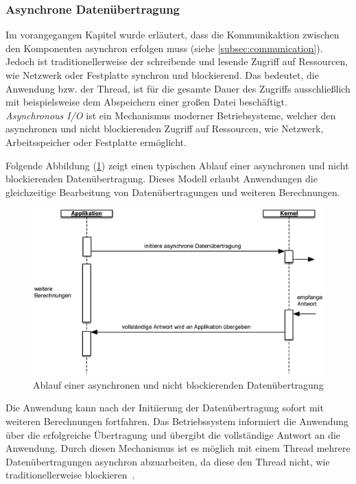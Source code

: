 \subsubsection{Asynchrone Datenübertragung}\label{subsec:async-io}
Im vorangegangen Kapitel wurde erläutert, dass die Kommunikaktion zwischen den Komponenten asynchron erfolgen muss (siehe \autoref{subsec:communication}). Jedoch ist traditionellerweise der schreibende und lesende Zugriff auf Ressourcen, wie Netzwerk oder Festplatte synchron und blockierend. Das bedeutet, die Anwendung bzw. der Thread, ist für die gesamte Dauer des Zugriffs ausschließlich mit beispielsweise dem Abspeichern einer großen Datei beschäftigt.\\
\textit{Asynchronous I/O} ist ein Mechanismus moderner Betriebsysteme, welcher den asynchronen und nicht blockierenden Zugriff auf Ressourcen, wie Netzwerk, Arbeitsspeicher oder Festplatte ermöglicht.

\pagebreak

Folgende Abbildung (\ref{fig:async-io}) zeigt einen typischen Ablauf einer asynchronen und nicht blockierenden Datenübertragung. Dieses Modell erlaubt Anwendungen die gleichzeitige Bearbeitung von Datenübertragungen und weiteren Berechnungen. 

\begin{figure}[H]
 \centering
 \includegraphics[width=1.0\textwidth]{4-Hauptteil/async-io/async-io.eps}
 \caption{Ablauf einer asynchronen und nicht blockierenden Datenübertragung}
 \label{fig:async-io}
\end{figure}

Die Anwendung kann nach der Initiierung der Datenübertragung sofort mit weiteren Berechnungen fortfahren. Das Betriebssystem informiert die Anwendung über die erfolgreiche Übertragung und übergibt die vollständige Antwort an die Anwendung. Durch diesen Mechanismus ist es möglich mit einem Thread mehrere Datenübertragungen asynchron abzuarbeiten, da diese den Thread nicht, wie traditionellerweise blockieren~\cite{jones_boost_2006}.

